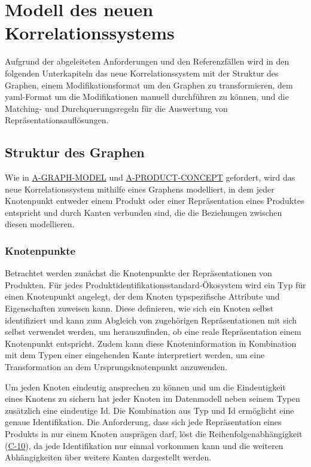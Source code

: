 \section{Modell des neuen Korrelationssystems}\label{sec:model-modellierungsansatz}

Aufgrund der abgeleiteten Anforderungen und den Referenzfällen wird in den folgenden Unterkapiteln das neue Korrelationssystem mit der Struktur des Graphen, einem Modifikationsformat um den Graphen zu transformieren, dem \acrshort{yaml}-Format um die Modifikationen manuell durchführen zu können, und die Matching- und Durchquerungsregeln für die Auswertung von Repräsentationsauflösungen.

\subsection{Struktur des Graphen}\label{subsec:model-graph-struktur}

Wie in \hyperref[subsec:req-format-product-graph]{A-GRAPH-MODEL} und \hyperref[subsec:req-product-concept]{A-PRODUCT-CONCEPT} gefordert, wird das neue Korrelationssystem mithilfe eines Graphens modelliert, in dem jeder Knotenpunkt entweder einem Produkt oder einer Repräsentation eines Produktes entspricht und durch Kanten verbunden sind, die die Beziehungen zwischen diesen modellieren.

\subsubsection{Knotenpunkte}\label{subsubsec:model-graph-knoten}

Betrachtet werden zunächst die Knotenpunkte der Repräsentationen von Produkten.
Für jedes Produktidentifikationsstandard-Ökosystem wird ein Typ für einen Knotenpunkt angelegt, der dem Knoten typspezifische Attribute und Eigenschaften zuweisen kann.
Diese definieren, wie sich ein Knoten selbst identifiziert und kann zum Abgleich von zugehörigen Repräsentationen mit sich selbst verwendet werden, um herauszufinden, ob eine reale Repräsentation einem Knotenpunkt entspricht.
Zudem kann diese Knoteninformation in Kombination mit dem Typen einer eingehenden Kante interpretiert werden, um eine Transformation an dem Ursprungsknotenpunkt anzuwenden.

Um jeden Knoten eindeutig ansprechen zu können und um die Eindeutigkeit eines Knotens zu sichern hat jeder Knoten im Datenmodell neben seinem Typen zusätzlich eine eindeutige Id.
Die Kombination aus Typ und Id ermöglicht eine genaue Identifikation.
Die Anforderung, dass sich jede Repräsentation eines Produkts in nur einem Knoten ausprägen darf, löst die Reihenfolgenabhängigkeit (\hyperref[subsec:c-10-order-dependency]{C-10}), da jede Identifikation nur einmal vorkommen kann und die weiteren Abhängigkeiten über weitere Kanten dargestellt werden.

